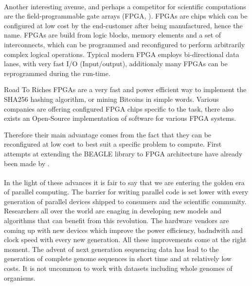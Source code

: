 \paragraph{}
Another interesting avenue, and perhaps a competitor for scientific computations are the field-programmable gate arrays (FPGA, \citet{Kuon2008}).
FPGAs are chips which can be configured at low cost by the end-customer after being manufactured, hence the name.
FPGAs are build from logic blocks, memory elements and a set of interconnects, which can be programmed and reconfigured to perform arbitrarily complex logical operations.
Typical modern FPGA employs bi-directional data lanes, with very fast I/O (Input/output), additionaly many FPGAs can be reprogrammed during the run-time. 

\begin{remark}{Road To Riches}
FPGAs are a very fast and power efficient way to implement the SHA256 hashing algorithm, or mining Bitcoins in simple words.
Various companies are offering configured FPGA chips specific to the task, there also exists an Open-Source implementation of software for various FPGA systems.
\end{remark}

Therefore their main advantage comes from the fact that they can be reconfigured at low  cost to best suit a specific problem to compute.
First attempts at extending the BEAGLE library to FPGA architecture have already been made by \cite{Jin2013}.

\paragraph{}
In the light of these advances it is fair to say that we are entering the golden era of parallel computing.
The barrier for writing parallel code is set lower with every generation of parallel devices shipped to consumers and the scientific community.
Researchers all over the world are enaging in developing new models and algorithms that can benefit from this revolution.
The hardware vendors are coming up with new devices which improve the power efficiency, badndwith and clock speed with every new generation.
All these improvements come at the right moment.
The advent of next generation sequencing data has lead to the generation of complete genome sequences in short time and at relatively low costs.
It is not uncommon to work with datasets including whole genomes of organisms.

